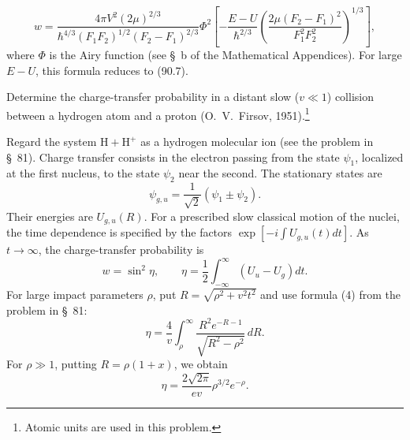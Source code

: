 \begin{equation}
w=\frac{4\pi V^2(2\mu)^{2/3}}{\hbar^{4/3}(F_1F_2)^{1/2}(F_2-F_1)^{2/3}}
\Phi^2\!\left[-\frac{E-U}{\hbar^{2/3}}\left(\frac{2\mu(F_2-F_1)^2}{F_1^2F_2^2}\right)^{1/3}\right],
\tag{90.22}
\end{equation}
where $\Phi$ is the Airy function (see \S~b of the Mathematical Appendices). For large $E-U$, this formula reduces to (90.7).

\ProblemHeading[4] Determine the charge-transfer probability in a distant slow ($v\ll1$) collision between a hydrogen atom and a proton (O.~V.~Firsov, 1951).\footnote{Atomic units are used in this problem.}

\SolutionHeading Regard the system $\mathrm H+\mathrm H^+$ as a hydrogen molecular ion (see the problem in \S~81). Charge transfer consists in the electron passing from the state $\psi_1$, localized at the first nucleus, to the state $\psi_2$ near the second. The stationary states are
\[
\psi_{g,u}=\frac1{\sqrt2}(\psi_1\pm\psi_2).
\]
Their energies are $U_{g,u}(R)$. For a prescribed slow classical motion of the nuclei, the time dependence is specified by the factors $\exp[-i\int U_{g,u}(t)dt]$. As $t\to\infty$, the charge-transfer probability is
\[
w=\sin^2\eta,\qquad \eta=\frac12\int_{-\infty}^{\infty}(U_u-U_g)dt.
\]
For large impact parameters $\rho$, put $R=\sqrt{\rho^2+v^2t^2}$ and use formula (4) from the problem in \S~81:
\[
\eta=\frac4v\int_\rho^\infty\frac{R^2e^{-R-1}}{\sqrt{R^2-\rho^2}}\,dR.
\]
For $\rho\gg1$, putting $R=\rho(1+x)$, we obtain
\[
\eta=\frac{2\sqrt{2\pi}}{ev}\rho^{3/2}e^{-\rho}.
\]
